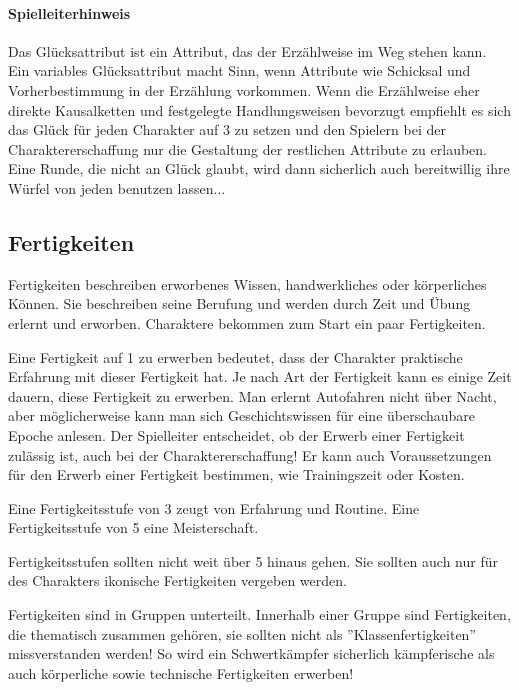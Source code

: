 \documentclass{article}
\begin{document}
\begin{mdframed}[hidealllines=true, backgroundcolor=black!10]
\paragraph{Spielleiterhinweis}

Das Glücksattribut ist ein Attribut, das der Erzählweise im Weg stehen kann. Ein variables Glücksattribut macht Sinn,
wenn Attribute wie Schicksal und Vorherbestimmung in der Erzählung vorkommen. Wenn die Erzählweise eher direkte
Kausalketten und festgelegte Handlungsweisen bevorzugt empfiehlt es sich das Glück für jeden Charakter auf 3 zu
setzen und den Spielern bei der Charaktererschaffung nur die Gestaltung der restlichen Attribute zu erlauben. Eine
Runde, die nicht an Glück glaubt, wird dann sicherlich auch bereitwillig ihre Würfel von jeden benutzen lassen...

\end{mdframed}
\begin{center}
\section{Fertigkeiten}
\end{center}

Fertigkeiten beschreiben erworbenes Wissen, handwerkliches oder körperliches Können. Sie beschreiben seine Berufung
und werden durch Zeit und Übung erlernt und erworben. Charaktere bekommen zum Start ein paar Fertigkeiten.

Eine Fertigkeit auf 1 zu erwerben bedeutet, dass der Charakter praktische Erfahrung mit dieser Fertigkeit hat. Je nach
Art der Fertigkeit kann es einige Zeit dauern, diese Fertigkeit zu erwerben. Man erlernt Autofahren nicht über
Nacht, aber möglicherweise kann man sich Geschichtswissen für eine überschaubare Epoche anlesen. Der Spielleiter
entscheidet, ob der Erwerb einer Fertigkeit zulässig ist, auch bei der Charaktererschaffung! Er kann auch
Voraussetzungen für den Erwerb einer Fertigkeit bestimmen, wie Trainingszeit oder Kosten.

Eine Fertigkeitsstufe von 3 zeugt von Erfahrung und Routine. Eine Fertigkeitsstufe von 5 eine Meisterschaft.

Fertigkeitsstufen sollten nicht weit über 5 hinaus gehen. Sie sollten auch nur für des Charakters ikonische
Fertigkeiten vergeben werden.

Fertigkeiten sind in Gruppen unterteilt. Innerhalb einer Gruppe sind Fertigkeiten, die thematisch zusammen gehören,
sie sollten nicht als ''Klassenfertigkeiten'' missverstanden werden! So wird ein Schwertkämpfer sicherlich
kämpferische als auch körperliche sowie technische Fertigkeiten erwerben!
\end{document}
